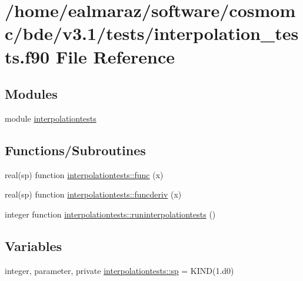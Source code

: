 \hypertarget{interpolation__tests_8f90}{}\section{/home/ealmaraz/software/cosmomc/bde/v3.1/tests/interpolation\+\_\+tests.f90 File Reference}
\label{interpolation__tests_8f90}
\subsection*{Modules}
\begin{DoxyCompactItemize}
\item 
module \mbox{\hyperlink{namespaceinterpolationtests}{interpolationtests}}
\end{DoxyCompactItemize}
\subsection*{Functions/\+Subroutines}
\begin{DoxyCompactItemize}
\item 
real(sp) function \mbox{\hyperlink{namespaceinterpolationtests_a889784a516823bb7b55caeb7622465a2}{interpolationtests\+::func}} (x)
\item 
real(sp) function \mbox{\hyperlink{namespaceinterpolationtests_a8d9832ae7aac0f3abc5823bfb68e8a85}{interpolationtests\+::funcderiv}} (x)
\item 
integer function \mbox{\hyperlink{namespaceinterpolationtests_a4884e2815dc1d6e85e77392363e72b83}{interpolationtests\+::runinterpolationtests}} ()
\end{DoxyCompactItemize}
\subsection*{Variables}
\begin{DoxyCompactItemize}
\item 
integer, parameter, private \mbox{\hyperlink{namespaceinterpolationtests_a4e83007da3730863a762c2e30c3d336f}{interpolationtests\+::sp}} = K\+I\+ND(1.d0)
\end{DoxyCompactItemize}
